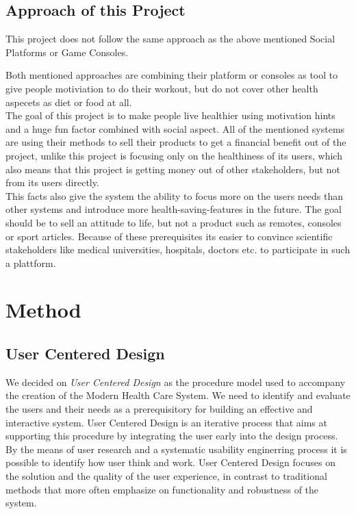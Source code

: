 \documentclass[a4paper,11pt]{article}
\begin{document}
\pagebreak

\subsection{Approach of this Project}
This project does not follow the same approach as the above mentioned Social Platforms or Game Consoles.

Both mentioned approaches are combining their platform or consoles as tool to give people motiviation to do their workout, but do not cover other health aspecets as diet or food at all. \\

The goal of this project is to make people live healthier using motivation hints and a huge fun factor combined with social aspect. All of the mentioned systems are using their methods to sell their products to get a financial benefit out of the project, unlike this project is focusing only on the healthiness of its users, which also means that this project is getting money out of other stakeholders, but not from its users directly. \\

This facts also give the system the ability to focus more on the users needs than other systems and introduce more health-saving-features in the future. The goal should be to sell an attitude to life, but not a product such as remotes, consoles or sport articles. Because of these prerequisites its easier to convince scientific stakeholders like medical universities, hospitals, doctors etc. to participate in such a plattform.

\pagebreak
\section{Method}
\label{sect:method}

\subsection{User Centered Design}
We decided on \emph{User Centered Design} as the procedure model used to accompany the creation of the Modern Health Care System. We need to identify and evaluate the users and their needs as a prerequisitory for building an effective and interactive system. User Centered Design is an iterative process that aims at supporting this procedure by integrating the user early into the design process. By the means of user research and a systematic usability enginerring process it is possible to identify how user think and work. User Centered Design focuses on the solution and the quality of the user experience, in contrast to traditional methods that more often emphasize on functionality and robustness of the system. \\
\end{document}
